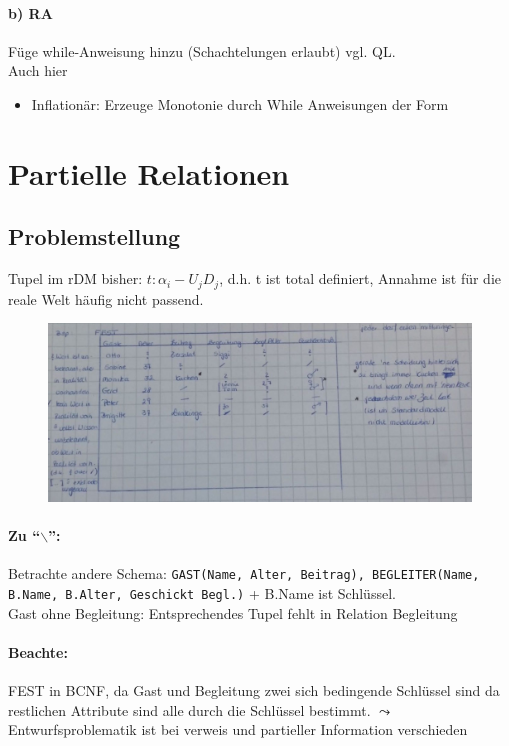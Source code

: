 \documentclass[12pt, a4paper]{article}
\begin{document}
\paragraph{b) RA} Füge while-Anweisung hinzu (Schachtelungen erlaubt) vgl. QL. \\ Auch hier
\begin{itemize}
	\item Inflationär: Erzeuge Monotonie durch While Anweisungen der Form
\end{itemize}

\section*{Partielle Relationen}

\subsection*{Problemstellung}
Tupel im rDM bisher: $t: \alpha_i - U_j D_j$, d.h. t ist total definiert, Annahme ist für die reale Welt häufig nicht passend.

\begin{figure}[h!]
\centering
\includegraphics[width=0.7\linewidth]{img/img28}
\caption{}
\label{fig:img28}
\end{figure}

\paragraph{Zu ``$\backslash$'':}
Betrachte andere Schema: \texttt{GAST(Name, Alter, Beitrag), BEGLEITER(Name, B.Name, B.Alter, Geschickt Begl.)} + B.Name ist Schlüssel. \\
Gast ohne Begleitung: Entsprechendes Tupel fehlt in Relation Begleitung \\

\paragraph{Beachte:}
FEST in BCNF, da Gast und Begleitung zwei sich bedingende Schlüssel sind da restlichen Attribute sind alle durch die Schlüssel bestimmt.
$\leadsto$ Entwurfsproblematik ist bei verweis und partieller Information verschieden \\
\end{document}
